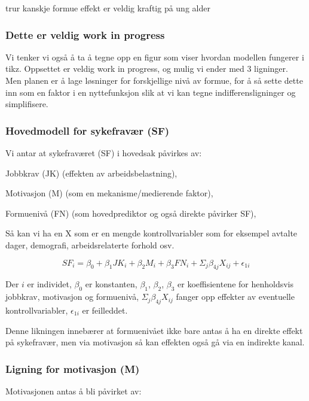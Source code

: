 \documentclass[
  12pt,
  a4paper,
  DIV=11,
  numbers=noendperiod]{scrartcl}
\begin{document}
trur kanskje formue effekt er veldig kraftig på ung alder

\subsubsection{Dette er veldig work in
progress}\label{dette-er-veldig-work-in-progress}

Vi tenker vi også å ta å tegne opp en figur som viser hvordan modellen
fungerer i tikz. Oppsettet er veldig work in progress, og mulig vi ender
med 3 ligninger. Men planen er å lage løsninger for forskjellige nivå av
formue, for å så sette dette inn som en faktor i en nyttefunksjon slik
at vi kan tegne indifferensligninger og simplifisere.

\subsubsection{Hovedmodell for sykefravær
(SF)}\label{hovedmodell-for-sykefravuxe6r-sf}

Vi antar at sykefraværet (SF) i hovedsak påvirkes av:

Jobbkrav (JK) (effekten av arbeidsbelastning),

Motivasjon (M) (som en mekanisme/medierende faktor),

Formuenivå (FN) (som hovedprediktor og også direkte påvirker SF),

Så kan vi ha en X som er en mengde kontrollvariabler som for eksempel
avtalte dager, demografi, arbeidsrelaterte forhold osv.

\[
SF_i = \beta_0 + \beta_1 JK_i + \beta_2 M_i + \beta_3 FN_i + \Sigma_j \beta_{4j}X_{ij} + \epsilon_{1i}
\]

Der \(i\) er individet, \(\beta_0\) er konstanten, \(\beta_1\),
\(\beta_2\), \(\beta_3\) er koeffisientene for henholdsvis jobbkrav,
motivasjon og formuenivå, \(\Sigma_j \beta_{4j}X_{ij}\) fanger opp
effekter av eventuelle kontrollvariabler, \(\epsilon_{1i}\) er
feilleddet.

Denne likningen innebærer at formuenivået ikke bare antas å ha en
direkte effekt på sykefravær, men via motivasjon så kan effekten også gå
via en indirekte kanal.

\subsubsection{Ligning for motivasjon
(M)}\label{ligning-for-motivasjon-m}

Motivasjonen antas å bli påvirket av:
\end{document}
